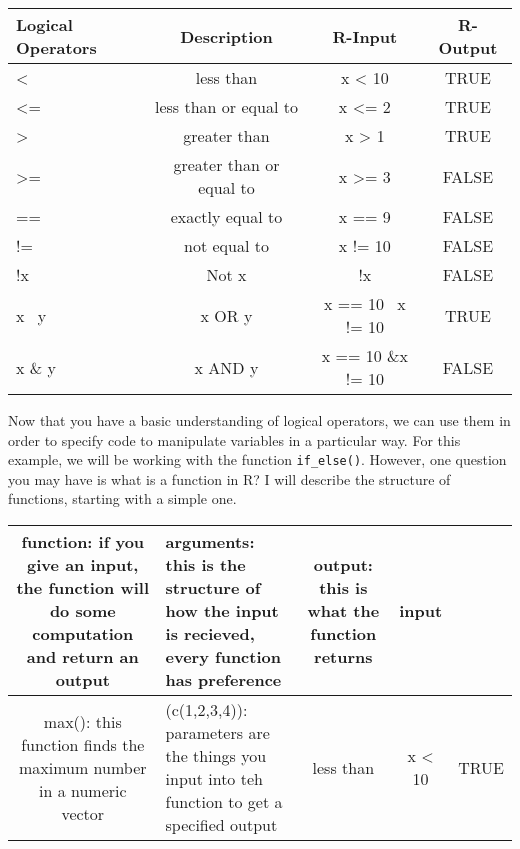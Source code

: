 \documentclass[]{book}
\begin{document}
\begin{longtable}[]{@{}lccc@{}}
\toprule
Logical Operators & Description & R-Input & R-Output\tabularnewline
\midrule
\endhead
\textless{} & less than & x \textless{} 10 & TRUE\tabularnewline
\textless{}= & less than or equal to & x \textless{}= 2 &
TRUE\tabularnewline
\textgreater{} & greater than & x \textgreater{} 1 & TRUE\tabularnewline
\textgreater{}= & greater than or equal to & x \textgreater{}= 3 &
FALSE\tabularnewline
== & exactly equal to & x == 9 & FALSE\tabularnewline
!= & not equal to & x != 10 & FALSE\tabularnewline
!x & Not x & !x & FALSE\tabularnewline
x \textbar{}~y & x OR y & x == 10 \textbar{}~x != 10 &
TRUE\tabularnewline
x \& y & x AND y & x == 10 \&x != 10 & FALSE\tabularnewline
\bottomrule
\end{longtable}

Now that you have a basic understanding of logical operators, we can use
them in order to specify code to manipulate variables in a particular
way. For this example, we will be working with the function
\texttt{if\_else()}. However, one question you may have is what is a
function in R? I will describe the structure of functions, starting with
a simple one.

\begin{longtable}[]{@{}clccc@{}}
\toprule
\begin{minipage}[b]{0.08\columnwidth}\centering\strut
function: if you give an input, the function will do some computation
and return an output\strut
\end{minipage} & \begin{minipage}[b]{0.17\columnwidth}\raggedright\strut
arguments: this is the structure of how the input is recieved, every
function has preference\strut
\end{minipage} & \begin{minipage}[b]{0.19\columnwidth}\centering\strut
output: this is what the function returns\strut
\end{minipage} & \begin{minipage}[b]{0.06\columnwidth}\centering\strut
input\strut
\end{minipage}\tabularnewline
\midrule
\endhead
\begin{minipage}[t]{0.08\columnwidth}\centering\strut
max(): this function finds the maximum number in a numeric vector\strut
\end{minipage} & \begin{minipage}[t]{0.17\columnwidth}\raggedright\strut
(c(1,2,3,4)): parameters are the things you input into teh function to
get a specified output\strut
\end{minipage} & \begin{minipage}[t]{0.19\columnwidth}\centering\strut
less than\strut
\end{minipage} & \begin{minipage}[t]{0.06\columnwidth}\centering\strut
x \textless{} 10\strut
\end{minipage} & \begin{minipage}[t]{0.06\columnwidth}\centering\strut
TRUE\strut
\end{minipage}\tabularnewline
\bottomrule
\end{longtable}
\end{document}
